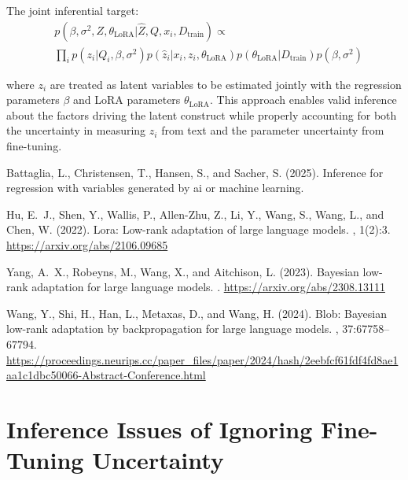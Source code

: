\documentclass[11pt]{article}
\begin{document}
The joint inferential target:
\begin{align}
&p(\beta, \sigma^2, Z, \theta_{\text{LoRA}}|\hat{Z}, Q, x_i, D_{\text{train}}) \propto \label{eq:joint_target2} \\
&\prod_i p(z_i|Q_i, \beta, \sigma^2)p(\hat{z}_i|x_i, z_i, \theta_{\text{LoRA}})p(\theta_{\text{LoRA}}|D_{\text{train}})p(\beta, \sigma^2) \nonumber
\end{align}

where $z_i$ are treated as latent variables to be estimated jointly with the regression parameters $\beta$ and LoRA parameters $\theta_{\text{LoRA}}$. This approach enables valid inference about the factors driving the latent construct while properly accounting for both the uncertainty in measuring $z_i$ from text and the parameter uncertainty from fine-tuning.

\newpage

\begin{thebibliography}{99}

Battaglia, L., Christensen, T., Hansen, S., and Sacher, S. (2025).
\newblock Inference for regression with variables generated by ai or machine learning.

Hu, E.~J., Shen, Y., Wallis, P., Allen-Zhu, Z., Li, Y., Wang, S., Wang, L., and Chen, W. (2022).
\newblock Lora: Low-rank adaptation of large language models.
, 1(2):3.
\newblock \url{https://arxiv.org/abs/2106.09685}

Yang, A.~X., Robeyns, M., Wang, X., and Aitchison, L. (2023).
\newblock Bayesian low-rank adaptation for large language models.
.
\newblock \url{https://arxiv.org/abs/2308.13111}

Wang, Y., Shi, H., Han, L., Metaxas, D., and Wang, H. (2024).
\newblock Blob: Bayesian low-rank adaptation by backpropagation for large language models.
, 37:67758--67794.
\newblock \url{https://proceedings.neurips.cc/paper_files/paper/2024/hash/2eebfcf61fdf4fd8ae1aa1c1dbc50066-Abstract-Conference.html}


\end{thebibliography}

\newpage
\appendix

\section{Inference Issues of Ignoring Fine-Tuning Uncertainty}
\label{appendix:llm_inference}
\end{document}
